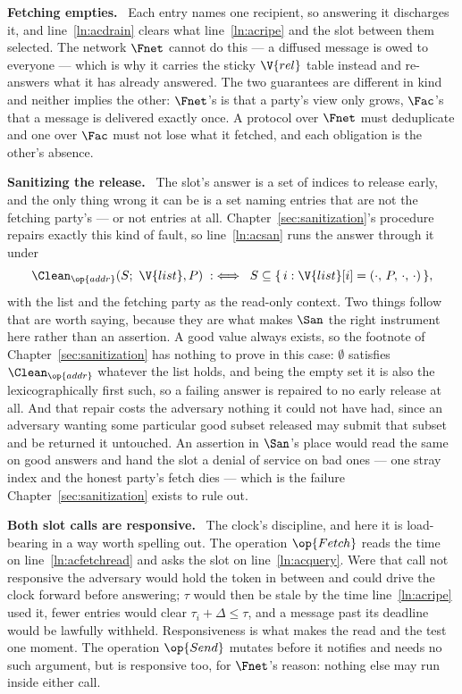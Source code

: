 \documentclass[10pt,oneside,openany]{book}
\newcommand{\heading}[1]{\medskip\par\noindent\textcolor{accent}{\textbf{#1.}}\ }
\theoremstyle{accentdef}
\theoremstyle{accentplain}
\begin{document}
\heading{Fetching empties} Each entry names one recipient, so answering it discharges it, and
line~\ref{ln:acdrain} clears what line~\ref{ln:acripe} and the slot between them selected. The network $\Fnet$
cannot do this --- a diffused message is owed to everyone --- which is why it carries the sticky
$\V{rel}$ table instead and re-answers what it has already answered. The two guarantees are
different in kind and neither implies the other: $\Fnet$'s is that a party's view only grows,
$\Fac$'s that a message is delivered exactly once. A protocol over $\Fnet$ must deduplicate and
one over $\Fac$ must not lose what it fetched, and each obligation is the other's absence.

\heading{Sanitizing the release} The slot's answer is a set of indices to release early, and the
only thing wrong it can be is a set naming entries that are not the fetching party's --- or not
entries at all. Chapter~\ref{sec:sanitization}'s procedure repairs exactly this kind of fault, so
line~\ref{ln:acsan} runs the answer through it under
\[
  \Clean_{\op{addr}}(S;\ \V{list}, P) \;:\iff\;
  S \subseteq \{\, i : \V{list}[i] = (\cdot,\, P,\, \cdot,\, \cdot) \,\} ,
\]
with the list and the fetching party as the read-only context. Two things follow that are worth
saying, because they are what makes $\San$ the right instrument here rather than an assertion. A
good value always exists, so the footnote of Chapter~\ref{sec:sanitization} has nothing to prove
in this case: $\emptyset$ satisfies $\Clean_{\op{addr}}$ whatever the list holds, and being the
empty set it is also the lexicographically first such, so a failing answer is repaired to no
early release at all. And that repair costs the adversary nothing it could not have had, since an
adversary wanting some particular good subset released may submit that subset and be returned it
untouched. An assertion in $\San$'s place would read the same on good answers and hand the slot a
denial of service on bad ones --- one stray index and the honest party's fetch dies --- which is
the failure Chapter~\ref{sec:sanitization} exists to rule out.

\heading{Both slot calls are responsive} The clock's discipline, and here it is load-bearing in a
way worth spelling out. The operation $\op{Fetch}$ reads the time on line~\ref{ln:acfetchread} and asks the slot
on line~\ref{ln:acquery}. Were that call not responsive the adversary would hold the token in
between and could drive the clock forward before answering; $\tau$ would then be stale by the time
line~\ref{ln:acripe} used it, fewer entries would clear $\tau_i + \Delta \leq \tau$, and a message
past its deadline would be lawfully withheld. Responsiveness is what makes the read and the test
one moment. The operation $\op{Send}$ mutates before it notifies and needs no such argument, but is responsive
too, for $\Fnet$'s reason: nothing else may run inside either call.
\end{document}
